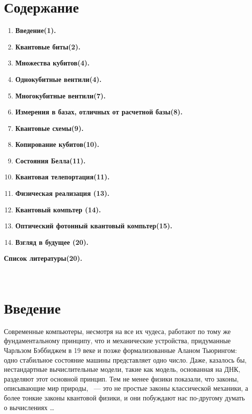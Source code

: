 \begin{multicols}{2}
    \section*{Содержание}
    \normalsize{
        \begin{enumerate}
            \item \textbf{Введение(1).}
            \item \textbf{Квантовые биты(2).}
            \item \textbf{Множества кубитов(4).}
            \item \textbf{Однокубитные вентили(4).}
            \item \textbf{Многокубитные вентили(7).}
            \item \textbf{Измерения в базах, отличных от расчетной базы(8).}
            \item \textbf{Квантовые схемы(9).}
            \item \textbf{Копирование кубитов(10).}
            \item \textbf{Состояния Белла(11).}
            \item \textbf{Квантовая телепортация(11).}
            \item \textbf{Физическая реализация (13).}
            \item \textbf{Квантовый компьтер (14).}
            \item \textbf{Оптический фотонный квантовый компьтер(15).}
            \item \textbf{Взгляд в будущее (20).}
        \end{enumerate}
        \textbf{Список литературы(20).}
    }\\
    \section*{Введение}
    \normalsize{Современные компьютеры, несмотря на все их чудеса, работают по тому же фундаментальному принципу, что и механические устройства, придуманные Чарльзом Бэббиджем в 19 веке и позже формализованные Аланом Тьюрингом: одно стабильное состояние машины представляет одно число. Даже, казалось бы, нестандартные вычислительные модели, такие как модель, основанная на ДНК, разделяют этот основной принцип. Тем не менее физики показали, что законы, описывающие мир природы, ~--- это не простые законы классической механики, а более тонкие законы квантовой физики, и они побуждают нас по-другому думать о вычислениях \ldots
    
}
\end{multicols}
